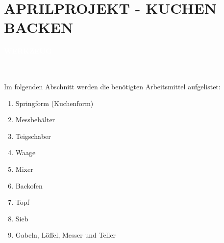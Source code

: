 \documentclass[a4paper, 12 pt]{article}
\newcommand{\coloredSectionDark}[1]{{\small \colorbox{DodgerBlue2}{\begin{minipage}{0.99\textwidth}{\textbf{#1 \vphantom{p\^{E}}}}\end{minipage}}}}
\begin{document}
\section*{\textcolor{DodgerBlue2}{APRILPROJEKT - KUCHEN BACKEN}}

\noindent
\coloredSectionDark{\textbf{\textcolor{white}{WERKZEUG}}}\\[-0.3cm]
\\
Im folgenden Abschnitt werden die benötigten Arbeitsmittel aufgelistet:
\begin{enumerate}
    \item Springform (Kuchenform)
    \item Messbehälter
    \item Teigschaber
    \item Waage
    \item Mixer 
    \item Backofen
    \item Topf
    \item Sieb
    \item Gabeln, Löffel, Messer und Teller 

\end{enumerate}
\end{document}
